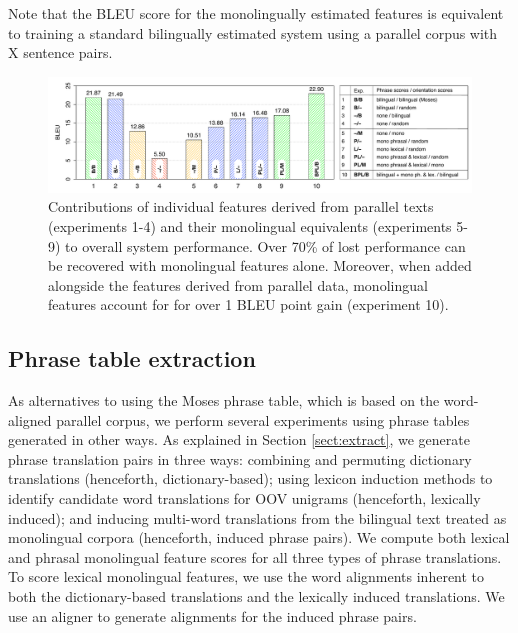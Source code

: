 \documentclass[11pt]{article}
\newcommand{\mnote}[1]{\marginpar{%
  \vskip-\baselineskip
  \raggedright\footnotesize
  \itshape\hrule\smallskip\tiny{#1}\par\smallskip\hrule}}
\newcommand{\mtodo}[1]{\mnote{\textcolor{red}{#1}}}
\begin{document}
 Note that the BLEU score for the monolingually estimated features is equivalent to training a standard bilingually estimated system using a parallel corpus with X sentence pairs.  \mtodo{Fill in from learning curve.}

\begin{figure}[t]
\begin{center}
\includegraphics[width=\linewidth]{../figures/lesionreplacement/lesionreplacementlegend.pdf}
\caption{Contributions of individual features derived from parallel texts (experiments 1-4) and their monolingual equivalents (experiments 5-9) to overall system performance.  Over 70\% of lost performance can be recovered with monolingual features alone.  Moreover, when added alongside the features derived from parallel data, monolingual features account for for over 1 BLEU point gain (experiment 10).}
\label{fig:lesionreplacement}
\end{center}
\vskip -0.2in
\end{figure}


\subsection{Phrase table extraction}\label{sect:exp:pt}
As alternatives to using the Moses phrase table, which is based on the word-aligned parallel corpus, we perform several experiments using phrase tables generated in other ways. As explained in Section \ref{sect:extract}, we generate phrase translation pairs in three ways: combining and permuting dictionary translations (henceforth, dictionary-based); using lexicon induction methods to identify candidate word translations for OOV unigrams (henceforth, lexically induced); and inducing multi-word translations from the bilingual text treated as monolingual corpora (henceforth, induced phrase pairs). We compute both lexical and phrasal monolingual feature scores for all three types of phrase translations. To score lexical monolingual features, we use the word alignments inherent to both the dictionary-based translations and the lexically induced translations. We use an aligner \cite{DeNero07} to generate alignments for the induced phrase pairs. 
\end{document}

